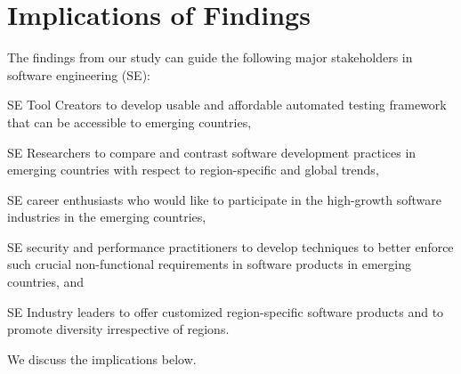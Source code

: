 \section{Implications of Findings}\label{implications}
The findings from our study can guide the following major stakeholders in software engineering (SE): 
\begin{inparaenum}[(1)]
\item SE Tool Creators to develop usable and affordable automated testing framework that can be accessible to emerging countries,     
\item SE Researchers to compare and contrast software development practices in emerging countries with respect to region-specific and global trends,   
\item SE career enthusiasts who would like to participate in the high-growth software industries in the emerging countries,    
\item SE security and performance practitioners to develop techniques to better enforce such crucial non-functional requirements in software products in emerging countries, and  
\item SE Industry leaders to offer customized region-specific software products and to promote diversity irrespective of regions.   
\end{inparaenum} We discuss the implications below.

 

